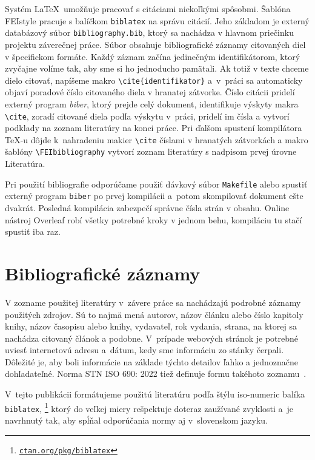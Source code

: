 Systém \LaTeX\ umožňuje pracovať s citáciami niekoľkými spôsobmi.
Šablóna FEIstyle pracuje s balíčkom \verb|biblatex| na správu citácií. Jeho základom je externý databázový súbor \texttt{bibliography.bib},
ktorý sa nachádza v hlavnom priečinku projektu záverečnej práce.
Súbor obsahuje bibliografické záznamy citovaných diel
v špecifickom formáte.
Každý záznam začína jedinečným identifikátorom, ktorý zvyčajne
volíme tak, aby sme si ho jednoducho pamätali.
Ak totiž v texte chceme dielo citovať, napíšeme makro \verb|\cite{identifikator}| a~v~práci sa automaticky objaví poradové číslo citovaného diela v hranatej zátvorke.
Číslo citácii pridelí externý program \textsl{biber},
ktorý prejde celý dokument, identifikuje výskyty makra \verb|\cite|, zoradí citované diela podľa výskytu v~práci,
pridelí im čísla a vytvorí podklady na zoznam literatúry na konci práce.
Pri ďalšom spustení kompilátora \TeX-u dôjde k~nahradeniu makier
\verb|\cite| číslami v hranatých zátvorkách a makro šablóny
\verb|\FEIbibliography| vytvorí zoznam literatúry s nadpisom
prvej úrovne Literatúra.

Pri použití bibliografie odporúčame použiť dávkový súbor
\texttt{Makefile} alebo spustiť externý program \texttt{biber}
po prvej kompilácii a~potom skompilovať dokument ešte dvakrát.
Posledná kompilácia zabezpečí správne čísla strán v obsahu.
Online nástroj Overleaf robí všetky potrebné kroky v jednom behu,
kompiláciu tu stačí spustiť iba raz.

\section{Bibliografické záznamy}
V zozname použitej literatúry v~závere práce sa nachádzajú
podrobné záznamy použitých zdrojov.
Sú to najmä mená autorov, názov článku alebo číslo kapitoly
knihy, názov časopisu alebo knihy, vydavateľ, rok vydania,
strana, na ktorej sa nachádza citovaný článok a podobne.
V~prípade webových stránok je potrebné uviesť internetovú adresu
a~dátum, kedy sme informáciu zo stánky čerpali.
Dôležité je, aby boli informácie na základe týchto detailov
ľahko a jednoznačne dohľadateľné.
Norma STN ISO 690: 2022 tiež definuje formu takéhoto zoznamu~\cite{iso690}.

V~tejto publikácii formátujeme použitú literatúru
podľa štýlu iso-numeric \cite{Hoftich2022iso690} balíka \texttt{biblatex},
\footnote{\href{https://ctan.org/pkg/biblatex}{\texttt{ctan.org/pkg/biblatex}}}
ktorý do veľkej miery rešpektuje doteraz zaužívané zvyklosti
a~je navrhnutý tak,
aby spĺňal odporúčania normy aj v~slovenskom jazyku.

